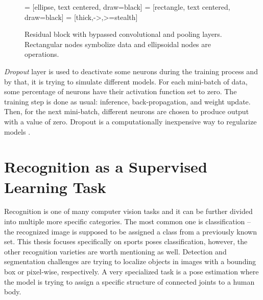 \begin{figure*}[ht!]
    \centering
    
     = [ellipse, text centered, draw=black]
     = [rectangle, text centered, draw=black]
     = [thick,->,>=stealth]

    
    \caption{Residual block with bypassed convolutional and pooling layers. Rectangular nodes symbolize data and ellipsoidal nodes are operations.}
    \label{fig:residual}
\end{figure*}

\textit{Dropout} layer is used to deactivate some neurons during the training process and by that, it is trying to simulate different models. For each mini-batch of data, some percentage of neurons have their activation function set to zero. The training step is done as usual: inference, back-propagation, and weight update. Then, for the next mini-batch, different neurons are chosen to produce output with a value of zero. Dropout is a computationally inexpensive way to regularize models \cite{Goodfellow-et-al-2016}.

\section{\label{sec:supervised}Recognition as a Supervised Learning Task}

Recognition is one of many computer vision tasks and it can be further divided into multiple more specific categories. The most common one is classification -- the recognized image is supposed to be assigned a class from a previously known set. This thesis focuses specifically on sports poses classification, however, the other recognition varieties are worth mentioning as well. Detection and segmentation challenges are trying to localize objects in images with a bounding box or pixel-wise, respectively. A very specialized task is a pose estimation where the model is trying to assign a specific structure of connected joints to a human body.

